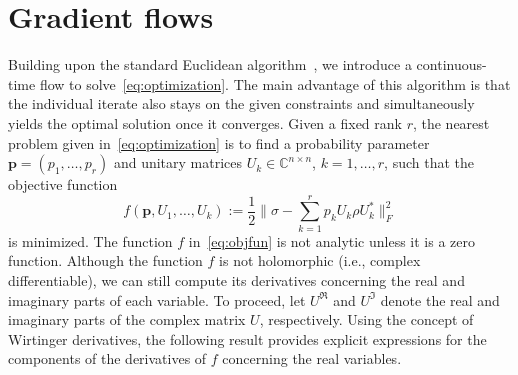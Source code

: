\documentclass[onefignum,onetabnum]{siamart220329}
\begin{document}
    \section{Gradient flows}
     Building upon the standard Euclidean algorithm~\cite{Absil2008, Gao2020, Boumal2022}, we introduce a continuous-time flow to solve~\eqref{eq:optimization}. The main advantage of this algorithm is that the individual iterate also stays on the given constraints and simultaneously yields the optimal solution once it converges. Given a fixed rank $r$, the nearest problem given in~\eqref{eq:optimization} is to find a probability parameter $\mathbf{p} = (p_1,\ldots,p_r)$ and unitary matrices $U_k\in\mathbb{C}^{n\times n}$, $k= 1,\ldots, r$, such that the objective function 
    \begin{equation}\label{eq:objfun}
    f(\mathbf{p},U_1,\ldots,U_k) := \dfrac{1}{2}\|\sigma - \sum_{k=1}^r p_k U_k \rho U_k^* \|_F^2
    \end{equation}
    is minimized. The function $f$ in~\eqref{eq:objfun} is not analytic unless it is a zero function. 
    Although the function $f$ is not holomorphic (i.e., complex differentiable), we can still compute its derivatives concerning the real and imaginary parts of each variable. To proceed, let $U^\mathfrak{R}$ and $U^\mathfrak{I}$ denote the real and imaginary parts of the complex matrix $U$, respectively. Using the concept of Wirtinger derivatives, the following result provides explicit expressions for the components of the derivatives of $f$ concerning the real variables.
    
\end{document}
